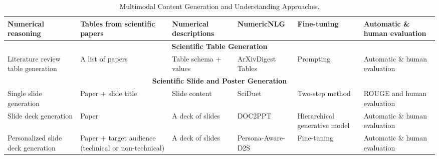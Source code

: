 \begin{table}[t]
\begin{small}
\begin{tabular}{p{2.5cm}|p{2.5cm}|p{2cm}|p{1.7cm}|p{1.8cm}|p{2cm}}
        Numerical reasoning \cite{suadaa-etal-2021-towards} & Tables from scientific papers & Numerical descriptions & NumericNLG & Fine-tuning & Automatic \& human evaluation \\  
        \midrule
        \multicolumn{6}{c}{\textbf{Scientific Table Generation}} \\ 
        \midrule
        Literature review table generation \cite{newman-etal-2024-arxivdigestables} & A list of papers & Table schema + values & ArXivDigest Tables & Prompting & Automatic \& human evaluation \\
        \midrule
        \multicolumn{6}{c}{\textbf{Scientific Slide and Poster Generation}} \\ 
        \midrule
        Single slide generation \cite{sun-etal-2021-d2s} & Paper + slide title & Slide content & SciDuet & Two-step method & ROUGE and human evaluation \\ 
        Slide deck generation \cite{Fu2021DOC2PPTAP} & Paper & A deck of slides & DOC2PPT & Hierarchical generative model & Automatic \& human evaluation \\ 
        Personalized slide deck generation \cite{mondal-etal-2024-presentations} & Paper + target audience (technical or non-technical) & A deck of slides & Persona-Aware-D2S & Fine-tuning & Automatic \& human evaluation \\
        \bottomrule
    \end{tabular}
    \caption{Multimodal Content Generation and Understanding Approaches.}
    \label{tab:section4.4_Method}
\end{small}
\end{table}
